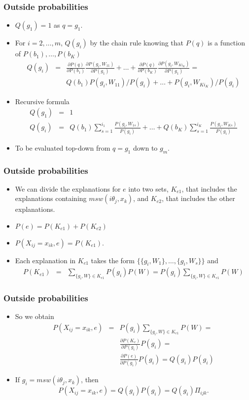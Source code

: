 \documentclass[trans,aspectratio=1610]{beamer}
\begin{document}
\begin{frame}
  \frametitle{Outside probabilities}
  \begin{itemize}
  \item $Q(g_1)=1$ as $q=g_1$. 
  \item For $i=2,\ldots,m$, 
$Q(g_i)$ by the chain rule knowing that $P(q)$ is a function 
of $P(b_1),\ldots,P(b_K)$
\begin{eqnarray*}
Q(g_i)&=&\frac{\partial P(q)}{\partial P(b_1)}\frac{\partial P(g_i,W_{11})}{\partial P(g_1)}+\ldots+
\frac{\partial P(q)}{\partial P(b_K)}\frac{\partial P(g_i,W_{Ki_K})}{\partial P(g_1)}=\\
&&Q(b_1)P(g_i,W_{11})/P(g_i)+\ldots+P(g_i,W_{Ki_K})/P(g_i)
\end{eqnarray*}
\item Recursive formula
\begin{eqnarray*}
Q(g_1)&=&1\\
Q(g_i)&=&Q(b_1)\sum_{s=1}^{i_1}\frac{P(g_i,W_{1s})}{P(g_i)}+\ldots+Q(b_K)\sum_{s=1}^{i_K}\frac{P(g_i,W_{Ks})}{P(g_i)}
\end{eqnarray*}
\item To be evaluated top-down from $q=g_1$ down to $g_m$. 
\end{itemize}
\end{frame}
\begin{frame}
  \frametitle{Outside probabilities}
  \begin{itemize}
\item We can divide the
explanations for $e$ into two sets, $K_{e1}$, that includes the explanations containing $msw(i\theta_j,x_k)$, and $K_{e2}$, that includes the other explanations.
\item   $P(e)=P(K_{e1})+ P(K_{e2})$
\item 
$P(X_{ij}=x_{ik},e)=P(K_{e1})$.
\item Each explanation in $K_{e1}$  takes the form
$\{\{g_i, W_{1}\}, \ldots,\{ g_i, W_{s}\}\}$ and
\begin{eqnarray}
P(K_{e1})&=&\sum_{\{g_i, W\} \in K_{e1}}P(g_i)P(W)=P(g_i)\sum_{\{g_i, W\} \in K_{e1}}P(W)
\end{eqnarray}
\end{itemize}
\end{frame}
\begin{frame}
  \frametitle{Outside probabilities}
  \begin{itemize}
  \item
So we obtain
\begin{eqnarray}
P(X_{ij}=x_{ik},e)&=&P(g_i)\sum_{\{g_i, W\} \in K_{e1}}P(W)=\nonumber\\
&&\frac{\partial P(K_{e})}{\partial P(g_i)}P(g_i)=\label{pen}\\
&&\frac{\partial P(e)}{\partial P(g_i)}P(g_i)=Q(g_i)P(g_i)\nonumber
\end{eqnarray}
  \item
If $g_i=msw(i\theta_j,x_k)$, then 
$$P(X_{ij}=x_{ik},e)=Q(g_i)P(g_i)=Q(g_i)\Pi_{ijk}.$$
\end{itemize}
\end{frame}
\end{document}
